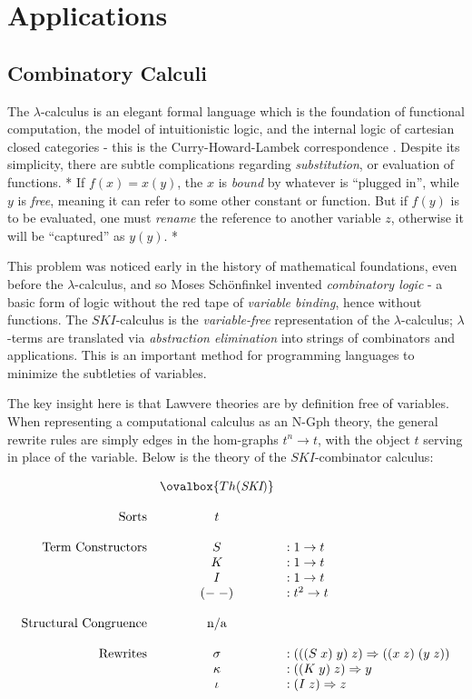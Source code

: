 \documentclass[a4paper,UKenglish]{article}
\theoremstyle{definition}
\newcommand{\Gph}{\mathrm{Gph}}
\newcommand{\NN}{\mathrm{N}}
\begin{document}
\section{Applications}

\subsection{Combinatory Calculi}
The $\lambda$-calculus is an elegant formal language which is the foundation of functional computation, the model of intuitionistic logic, and the internal logic of cartesian closed categories - this is the Curry-Howard-Lambek correspondence \cite{rosetta}. Despite its simplicity, there are subtle complications regarding \textit{substitution}, or evaluation of functions. * If $f(x) = x(y)$, the $x$ is \textit{bound} by whatever is ``plugged in'', while $y$ is \textit{free}, meaning it can refer to some other constant or function. But if $f(y)$ is to be evaluated, one must \textit{rename} the reference to another variable $z$, otherwise it will be ``captured'' as $y(y)$. *

This problem was noticed early in the history of mathematical foundations, even before the $\lambda$-calculus, and so Moses Sch\"onfinkel invented \textit{combinatory logic} \cite{combs} - a basic form of logic without the red tape of \textit{variable binding}, hence without functions. The $SKI$-calculus is the \textit{variable-free} representation of the $\lambda$-calculus; $\lambda$-terms are translated via \textit{abstraction elimination} into strings of combinators and applications. This is an important method for programming languages to minimize the subtleties of variables.

The key insight here is that Lawvere theories are by definition free of variables. When representing a computational calculus as an $\NN$-$\Gph$ theory, the general rewrite rules are simply edges in the hom-graphs $t^n \to t$, with the object $t$ serving in place of the variable. Below is the theory of the $SKI$-combinator calculus:

\[\begin{array}{rcl}
& \ovalbox{Th(\textit{SKI})} &\\\\
\text{Sorts} & t &\\\\
\text{Term Constructors} & S & :1 \to t\\
& K & :1 \to t\\
& I & :1 \to t\\
& (-\; -) & : t^2 \to t\\\\
\text{Structural Congruence} & \text{n/a} &\\\\
\mathrm{Rewrites} & \sigma & :(((S\; x)\; y)\; z) \Rightarrow ((x\; z)\; (y\; z))\\
& \kappa & :((K\; y)\; z) \Rightarrow y\\
& \iota & :(I\; z) \Rightarrow z\\
\end{array}\]
\end{document}

